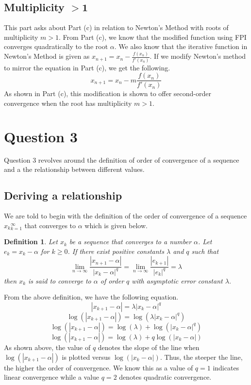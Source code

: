 \documentclass{article}
\newtheorem{definition}{Definition}
\begin{document}
\subsection{Multiplicity \(\mathbf{>1}\)}
This part asks about Part (c) in relation to Newton's Method with roots of multiplicity \(m>1\). From Part (c), we know that the modified function using FPI converges quadratically to the root \(\alpha\). We also know that the iterative function in Newton's Method is given as \(x_{n+1}=x_n-\frac{f(x_n)}{f'(x_n)}\). If we modify Newton's method to mirror the equation in Part (c), we get the following.
\[
x_{n+1}=x_n-m\frac{f(x_n)}{f'(x_n)}
\]
As shown in Part (c), this modification is shown to offer second-order convergence when the root has multiplicity \(m>1\).

\section{Question 3}
Question 3 revolves around the definition of order of convergence of a sequence and a the relationship between different values.
\subsection{Deriving a relationship}
We are told to begin with the definition of the order of convergence of a sequence {\(x_k\)}\(_{k=1}^\infty\) that converges to \(\alpha\) which is given below.
\begin{definition}
    Let {\(x_k\)} be a sequence that converges to a number \(\alpha\). Let \(e_k = x_k-\alpha\) for \(k \geq 0\). If there exist positive constants \(\lambda\) and \(q\) such that
    \[
    \lim_{n\to\infty}\frac{|x_{n+1}-\alpha|}{|x_k-\alpha|^q}=\lim_{n\to\infty}\frac{|e_{k+1}|}{|e_k|^q} = \lambda
    \]
    then {\(x_k\)} is said to converge to \(\alpha\) of order \(q\) with asymptotic error constant \(\lambda\).
\end{definition}
From the above definition, we have the following equation.
\[
|x_{k+1}-\alpha|=\lambda|x_k-\alpha|^q
\]
\[
\log(|x_{k+1}-\alpha|)=\log(\lambda|x_k-\alpha|^q)
\]
\[
\log(|x_{k+1}-\alpha|)=\log(\lambda)+\log(|x_k-\alpha|^q)
\]
\[
\log(|x_{k+1}-\alpha|)=\log(\lambda)+q\log(|x_k-\alpha|)
\]
As shown above, the value of \(q\) denotes the slope of the line when \(\log(|x_{k+1}-\alpha|)\) is plotted versus \(\log(|x_k-\alpha|)\). Thus, the steeper the line, the higher the order of convergence. We know this as a value of \(q=1\) indicates linear convergence while a value \(q = 2\) denotes quadratic convergence.
\end{document}
